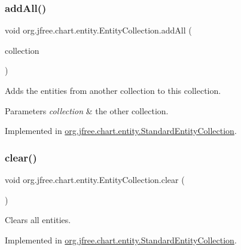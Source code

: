 \subsubsection{\texorpdfstring{add\+All()}{addAll()}}
{\footnotesize\ttfamily void org.\+jfree.\+chart.\+entity.\+Entity\+Collection.\+add\+All (\begin{DoxyParamCaption}\item[{\mbox{\hyperlink{interfaceorg_1_1jfree_1_1chart_1_1entity_1_1_entity_collection}{Entity\+Collection}}}]{collection }\end{DoxyParamCaption})}

Adds the entities from another collection to this collection.


\begin{DoxyParams}{Parameters}
{\em collection} & the other collection. \\
\hline
\end{DoxyParams}


Implemented in \mbox{\hyperlink{classorg_1_1jfree_1_1chart_1_1entity_1_1_standard_entity_collection_a82dc76894c237d1d31870aacb148f023}{org.\+jfree.\+chart.\+entity.\+Standard\+Entity\+Collection}}.

\mbox{\label{interfaceorg_1_1jfree_1_1chart_1_1entity_1_1_entity_collection_a425608737568917935db291594224dd5}} 
\subsubsection{\texorpdfstring{clear()}{clear()}}
{\footnotesize\ttfamily void org.\+jfree.\+chart.\+entity.\+Entity\+Collection.\+clear (\begin{DoxyParamCaption}{ }\end{DoxyParamCaption})}

Clears all entities. 

Implemented in \mbox{\hyperlink{classorg_1_1jfree_1_1chart_1_1entity_1_1_standard_entity_collection_adf0e1158e1b1505658fd5620b111f477}{org.\+jfree.\+chart.\+entity.\+Standard\+Entity\+Collection}}.

\mbox{\label{interfaceorg_1_1jfree_1_1chart_1_1entity_1_1_entity_collection_a6c5ae749a998551433c0e172bf11cfb6}} 

